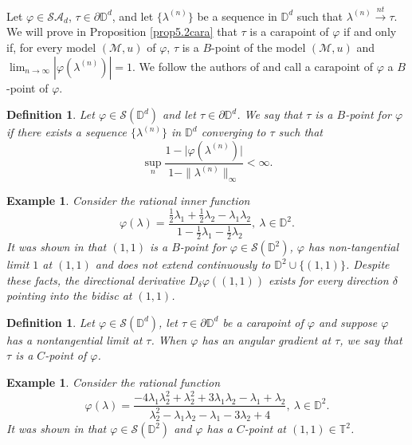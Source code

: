 \documentclass[11pt, reqno]{amsart}
\newtheorem{definition}[theorem]{Definition}
\newtheorem{example}[theorem]{Example}
\newcommand\1{\boldsymbol {1}}
\numberwithin{equation}{section}
\begin{document}
 Let $\varphi\in\mathcal{SA}_{d}$, $\tau\in\partial\mathbb{D}^{d}$, and let $\{\lambda^{(n)}\}$ be a sequence in $\mathbb{D}^{d}$ such that $\lambda^{(n)}{\overset{nt}\rightarrow}\tau$. We will prove in  
Proposition \ref{prop5.2cara} that $\tau$ is a carapoint of $\varphi$ if and only if,  for every model $(\mathcal{M},u)$ of $\varphi$,  $\tau$ is a $B$-point of the model $(\mathcal{M},u)$ and  $ \lim_{n \to \infty} |\varphi(\lambda^{(n)})| =1$.  We follow  the authors of \cite{AMYcara} and call a carapoint of $\varphi$  a $B$-point of $\varphi$.

\begin{definition}{}\label{B-point-phi}
Let $\varphi\in\mathcal{S}(\mathbb{D}^{d})$ and let $\tau\in \partial\mathbb{D}^{d}$. We say that $\tau$ is a {\em{$B$-point}} for $\varphi$ if there exists a sequence $\{\lambda^{(n)}\}$ in $\mathbb{D}^{d}$ converging to $\tau$ such that 
$$\sup_{n}\dfrac{1-\lvert{\varphi(\lambda^{(n)})}\rvert}{1-\|\lambda^{(n)}\|_{\infty}}<\infty.$$
\end{definition}
\begin{example} {}\label{bpointforfuncexample} \rm
 Consider the rational inner function 
       $$\varphi(\lambda)=\dfrac{\frac{1}{2}\lambda_{1}+\frac{1}{2}\lambda_{2}-\lambda_{1}\lambda_{2}}{1-\frac{1}{2}\lambda_{1}-\frac{1}{2}\lambda_{2}},~\lambda\in\mathbb{D}^{2}.$$
It was shown in \cite[Section 6]{AMYcara}  that $(1,1)$ is a $B$-point for 
$\varphi\in\mathcal{S}(\mathbb{D}^{2})$, $\varphi$ has non-tangential limit $1$ at $(1,1)$ and does not extend continuously to $\mathbb{D}^{2}\cup\{(1,1)\}$. Despite these facts, the directional derivative $D_{\delta}\varphi((1,1))$ exists for every direction $\delta$
pointing into the bidisc at $(1,1)$.
    \end{example}

\begin{definition}{}
Let $\varphi\in\mathcal{S}(\mathbb{D}^{d})$, let $\tau\in\partial \mathbb{D}^{d}$ be a carapoint of $\varphi$ and suppose $\varphi$ has a nontangential limit at $\tau$. When $\varphi$ has an angular gradient at $\tau$, we say that $\tau$ is a $C$-point of $\varphi$.
\end{definition}
\begin{example} \rm
Consider the rational function 
        $$\varphi(\lambda)=\dfrac{-4\lambda_{1}\lambda_{2}^{2}+\lambda_{2}^{2}+3\lambda_{1}\lambda_{2}-\lambda_{1}+\lambda_{2}}{\lambda_{2}^{2}-\lambda_{1}\lambda_{2}-\lambda_{1}-3\lambda_{2}+4},~\lambda\in\mathbb{D}^{2}.$$
It was shown in \cite{AMYcara} that $\varphi\in\mathcal{S}(\mathbb{D}^{2})$ and $\varphi$ has a $C$-point at $(1,1)\in\mathbb{T}^{2}$.
    \end{example}
\end{document}
